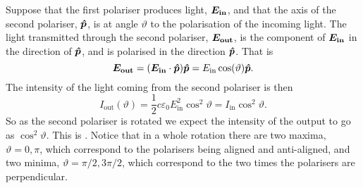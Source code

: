     Suppose that the first polariser produces light, \(\bm{E_{\mathrm{in}}}\), and that the axis of the second polariser, \(\bm{\hat{p}}\), is at angle \(\vartheta\) to the polarisation of the incoming light.
    The light transmitted through the second polariser, \(\bm{E_{\mathrm{out}}}\), is the component of \(\bm{E_{\mathrm{in}}}\) in the direction of \(\bm{\hat{p}}\), and is polarised in the direction \(\bm{\hat{p}}\).
    That is
    \[\bm{E_{\mathrm{out}}} = (\bm{E_{\mathrm{in}}}\cdot\bm{\hat{p}})\bm{\hat{p}} = E_{\mathrm{in}}\cos(\vartheta)\bm{\hat{p}}.\]
    The intensity of the light coming from the second polariser is then
    \[I_{\mathrm{out}}(\vartheta) = \frac{1}{2}c\varepsilon_0E_{\mathrm{in}}^2\cos^2\vartheta = I_{\mathrm{in}}\cos^2\vartheta.\]
    So as the second polariser is rotated we expect the intensity of the output to go as \(\cos^2\vartheta\).
    This is .
    Notice that in a whole rotation there are two maxima, \(\vartheta = 0, \pi\), which correspond to the polarisers being aligned and anti-aligned, and two minima, \(\vartheta = \pi/2, 3\pi/2\), which correspond to the two times the polarisers are perpendicular.
    
